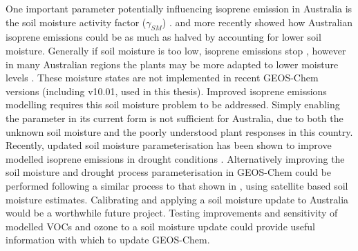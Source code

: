   One important parameter potentially influencing isoprene emission in Australia is the soil moisture activity factor ($\gamma_{SM}$) \parencite{Sindelarova2014,Bauwens2016}.
  \textcite{Sindelarova2014} and more recently \textcite{Emmerson2019} showed how Australian isoprene emissions could be as much as halved by accounting for lower soil moisture.
  Generally if soil moisture is too low, isoprene emissions stop \parencite{Pegoraro2004,Niinemets2010}, however in many Australian regions the plants may be more adapted to lower moisture levels \parencite{Emmerson2019}.
  These moisture states are not implemented in recent GEOS-Chem versions (including v10.01, used in this thesis).
  Improved isoprene emissions modelling requires this soil moisture problem to be addressed.
  Simply enabling the parameter in its current form is not sufficient for Australia, due to both the unknown soil moisture and the poorly understood plant responses in this country.
  Recently, updated soil moisture parameterisation has been shown to improve modelled isoprene emissions in drought conditions \parencite{Jiang2018}.
  Alternatively improving the soil moisture and drought process parameterisation in GEOS-Chem could be performed following a similar process to that shown in \textcite{Emmerson2019}, using satellite based soil moisture estimates.
  Calibrating and applying a soil moisture update to Australia would be a worthwhile future project.
  Testing improvements and sensitivity of modelled VOCs and ozone to a soil moisture update could provide useful information with which to update GEOS-Chem.
  
